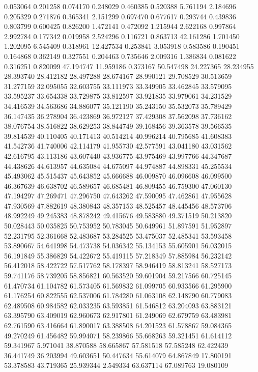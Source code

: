 0.053064
0.201258
0.074170
0.248029
0.460385
0.520388
5.761194
2.184696
0.205329
0.271876
0.365341
2.151299
0.697470
0.677617
0.293744
0.439836
0.803799
0.600425
0.826200
1.472141
0.472092
1.215944
2.622168
0.997864
2.992784
0.177342
0.019958
2.524296
0.116721
0.863713
42.161286
1.701450
1.202095
6.545409
0.318961
12.427534
0.253841
3.053918
0.583586
0.190451
0.164868
0.362149
0.327551
0.204463
0.735646
2.009316
1.386834
0.081622
0.316251
0.820099
47.194747
11.959186
0.373167
50.547498
24.227365
28.234955
28.393740
28.412182
28.497288
28.674167
28.990121
29.708529
30.513659
31.277159
32.095055
32.603755
33.111973
33.349905
33.462845
33.579095
33.595237
33.654338
33.729875
33.812597
33.921835
33.979061
34.231529
34.416539
34.563686
34.886077
35.121190
35.243150
35.532073
35.789429
36.147435
36.278904
36.423869
36.972127
37.429308
37.562098
37.736162
38.076754
38.516822
38.629253
38.844749
39.168456
39.363578
39.566535
39.814539
40.110405
40.171413
40.514214
40.996214
40.795685
41.608383
41.542736
41.740006
42.114179
41.955730
42.577591
43.041180
43.031562
42.616795
43.113186
43.607440
43.936775
43.975469
43.997766
44.347687
44.438626
44.613957
44.635084
44.675097
44.974887
44.898331
45.255534
45.493062
45.515437
45.643852
45.666688
46.009870
46.096608
46.099500
46.367639
46.638702
46.589657
46.685481
46.809455
46.759300
47.060130
47.194297
47.269471
47.296750
47.643262
47.590095
47.462861
47.955628
47.930569
47.882619
48.380843
48.357153
48.525457
48.445456
48.573706
48.992249
49.245383
48.878242
49.415676
49.583880
49.371519
50.213820
50.028443
50.035825
50.753952
50.783045
50.649961
51.897591
51.952897
52.231795
52.361668
52.483687
53.284525
53.475037
52.485341
53.593458
53.890667
54.641998
54.473738
54.036342
55.134153
55.605901
56.032015
56.191849
55.386829
54.422672
55.419115
57.218349
57.885984
56.232142
56.412018
58.422722
57.517762
58.178397
58.946419
58.813241
58.527173
59.741176
58.739205
58.856821
60.563520
59.601904
59.217566
60.725145
61.470734
61.104782
61.573405
61.569832
61.099705
60.933566
61.295900
61.176254
60.822555
62.537006
61.784280
61.063108
62.148790
60.779083
62.489508
60.984582
62.033235
63.593851
61.546812
63.204093
63.883121
63.395790
63.409019
62.960673
62.917801
61.249069
62.679759
63.483981
62.761590
63.416664
61.890017
63.388508
64.201523
61.578867
59.084365
49.270249
61.456482
59.994071
58.239866
55.668263
59.321451
61.614112
59.341967
5.971041
38.870588
58.665867
57.581518
57.585248
62.422439
36.441749
36.203994
49.603651
50.447634
55.614079
64.867849
17.800191
53.378583
43.719365
25.939344
2.549334
63.637114
67.089763
19.080109
